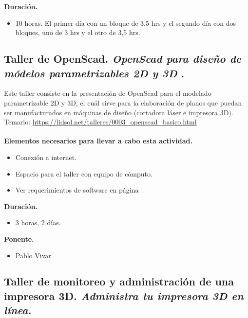 \documentclass[a4paper,11pt]{article}                 %
\begin{document}
  \textbf{Duración.}
  \begin{itemize}
    \item 10 horas. El primer día con un bloque de 3,5 hrs y el segundo día con dos bloques, uno de 3 hrs y el otro de 3,5 hrs.
  \end{itemize}
  
      \subsection{Taller de OpenScad. \textit{OpenScad para diseño de módelos parametrizables 2D y 3D} .}                                     %

  Este taller consiste en la presentación de OpenScad para el modelado parametrizable 2D y 3D, el cuál sirve para la elaboración de planos que puedan ser manufacturados en máquinas de diseño (cortadora láser e impresora 3D).
  Temario: \url{https://lidsol.net/talleres/0003_openscad_basico.html}
      \paragraph{}
  \textbf{Elementos necesarios para llevar a cabo esta actividad.}
  \begin{itemize}
    \label{list:openscad}
    \item Conexión a internet.
    \item Espacio para el taller con equipo de cómputo. 
    \item Ver requerimientos de software en página~\pageref{list:openscads}.
  \end{itemize}
  
  \textbf{Duración.}
  \begin{itemize}
    \item 3 horas, 2 días.
  \end{itemize}
  
            \textbf{Ponente.}
  \begin{itemize}
    \item Pablo Vivar.
  \end{itemize}
  
  
  \subsection{Taller de monitoreo y administración de una impresora 3D. \textit{Administra tu impresora 3D en línea}.}                                     %
\end{document}
